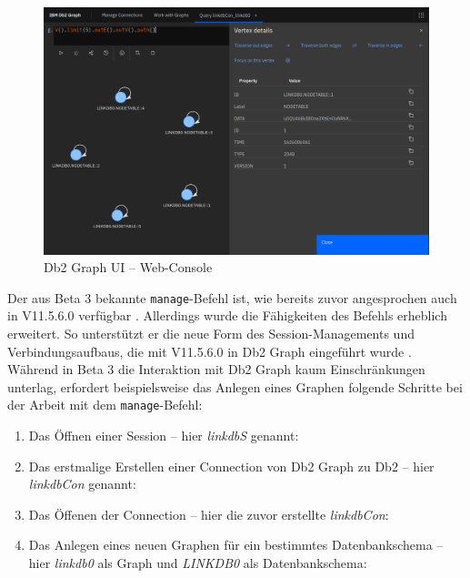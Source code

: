 \begin{figure}[!ht]
    \centering
    \includegraphics[width=\textwidth]{images/db2_graph_webconsole.png}
    \vspace{0.1em}
    \caption[Db2 Graph UI -- Web-Console]{Db2 Graph UI -- Web-Console}
    \label{fig:db2_graph_webconsole}
\end{figure}

Der aus Beta 3 bekannte \texttt{manage}-Befehl ist, wie bereits zuvor angesprochen auch in V11.5.6.0 verfügbar \cite{ibm_docs_db2_graph_commands}. Allerdings wurde die Fähigkeiten des Befehls erheblich erweitert. So unterstützt er die neue Form des Session-Managements und Verbindungsaufbaus, die mit V11.5.6.0 in Db2 Graph eingeführt wurde \cite{ibm_docs_db2_graph_commands}. Während in Beta 3 die Interaktion mit Db2 Graph kaum Einschränkungen unterlag, erfordert beispielsweise das Anlegen eines Graphen folgende Schritte bei der Arbeit mit dem \texttt{manage}-Befehl:

\begin{enumerate}
    \item Das Öffnen einer Session -- hier \textit{linkdbS} genannt:\\
    \item Das erstmalige Erstellen einer Connection von Db2 Graph zu Db2 -- hier \textit{linkdbCon} genannt:\\
    \item Das Öffenen der Connection -- hier die zuvor erstellte \textit{linkdbCon}:\\
    \item Das Anlegen eines neuen Graphen für ein bestimmtes Datenbankschema -- hier \textit{linkdb0} als Graph und \textit{LINKDB0} als Datenbankschema:\\ 
\end{enumerate}

